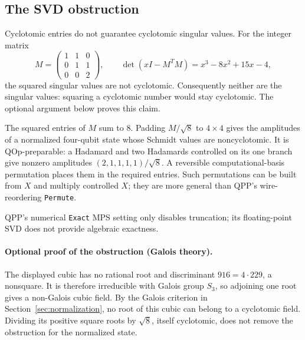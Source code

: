 \documentclass[11pt,a4paper]{article}
\newcommand{\code}[1]{\texttt{#1}}
\begin{document}
\subsection{The SVD obstruction}
Cyclotomic entries do not guarantee cyclotomic singular values.
For the integer matrix
\[
M=\begin{pmatrix}1&1&0\\0&1&1\\0&0&2\end{pmatrix},
\qquad \det(xI-M^TM)=x^3-8x^2+15x-4,
\]
the squared singular values are not cyclotomic. Consequently neither
are the singular values: squaring a cyclotomic number would stay
cyclotomic. The optional argument below proves this claim.

The squared entries of $M$ sum to $8$. Padding $M/\sqrt8$ to
$4\times4$ gives the amplitudes of a normalized four-qubit state whose
Schmidt values are noncyclotomic. It is QOp-preparable: a Hadamard and
two Hadamards controlled on its one branch give nonzero amplitudes
$(2,1,1,1,1)/\sqrt8$. A reversible computational-basis permutation
places them in the required entries. Such permutations can be built
from $X$ and multiply controlled $X$; they are more general than QPP's
wire-reordering \code{Permute}.

QPP's numerical \code{Exact} MPS setting only disables truncation;
its floating-point SVD does not provide algebraic exactness.

\paragraph{Optional proof of the obstruction (Galois theory).}
The displayed cubic has no rational root and discriminant
$916=4\cdot229$, a nonsquare. It is therefore irreducible with Galois
group $S_3$, so adjoining one root gives a non-Galois cubic field.
By the Galois criterion in Section~\ref{sec:normalization}, no root
of this cubic can belong to a cyclotomic field.
Dividing its positive square roots by $\sqrt8$, itself cyclotomic,
does not remove the obstruction for the normalized state.
\end{document}
